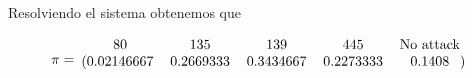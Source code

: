 \documentclass[11pt]{article}
\begin{document}
Resolviendo el sistema obtenemos que

\begin{equation*}
  \pi = 
  \begin{blockarray}{ccccc}
    80 & 135 & 139 & 445 & \text{No attack} \\
    \begin{block}{(ccccc)}
      0.02146667 & 0.2669333 & 0.3434667 & 0.2273333 & 0.1408 \\
    \end{block}
  \end{blockarray}
\end{equation*}

\end{document}
